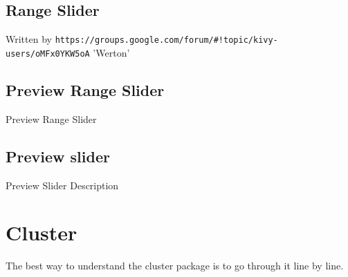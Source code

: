 \subsection{Range Slider}
Written by \verb|https://groups.google.com/forum/#!topic/kivy-users/oMFx0YKW5oA| 'Werton'

\subsection{Preview Range Slider}
Preview Range Slider

\subsection{Preview slider}
Preview Slider Description

\section{Cluster}
The best way to understand the cluster package is to go through it line by line.

